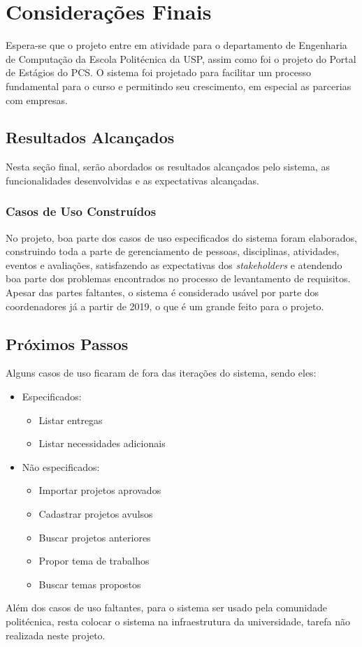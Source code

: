 \chapter{Considerações Finais}\label{chap:consideracoes-finais}
Espera-se que o projeto entre em atividade para o departamento de Engenharia de Computação da Escola Politécnica da USP, assim como foi o projeto do Portal de Estágios do PCS. O sistema foi projetado para facilitar um processo fundamental para o curso e permitindo seu crescimento, em especial as parcerias com empresas.

\section{Resultados Alcançados}
Nesta seção final, serão abordados os resultados alcançados pelo sistema, as funcionalidades desenvolvidas e as expectativas alcançadas.

\subsection{Casos de Uso Construídos}
No projeto, boa parte dos casos de uso especificados do sistema foram elaborados, construindo toda a parte de gerenciamento de pessoas, disciplinas, atividades, eventos e avaliações, satisfazendo as expectativas dos \textit{stakeholders} e atendendo boa parte dos problemas encontrados no processo de levantamento de requisitos. Apesar das partes faltantes, o sistema é considerado usável por parte dos coordenadores já a partir de 2019, o que é um grande feito para o projeto.

\section{Próximos Passos}

Alguns casos de uso ficaram de fora das iterações do sistema, sendo eles:

\begin{itemize}
    \item Especificados:
    \begin{itemize}
        \item Listar entregas
        \item Listar necessidades adicionais
    \end{itemize}
    
    \item Não especificados:
    \begin{itemize}
        \item Importar projetos aprovados
        \item Cadastrar projetos avulsos
        \item Buscar projetos anteriores
        \item Propor tema de trabalhos
        \item Buscar temas propostos
    \end{itemize}
\end{itemize}

Além dos casos de uso faltantes, para o sistema ser usado pela comunidade politécnica, resta colocar o sistema na infraestrutura da universidade, tarefa não realizada neste projeto.